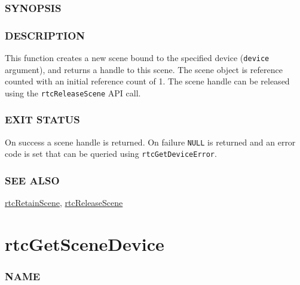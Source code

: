 \subsubsection{SYNOPSIS}\label{synopsis}

\begin{Shaded}
\begin{Highlighting}[]

\OperatorTok{(}\OperatorTok{);}
\end{Highlighting}
\end{Shaded}

\subsubsection{DESCRIPTION}\label{description}

This function creates a new scene bound to the specified device
(\texttt{device} argument), and returns a handle to this scene. The
scene object is reference counted with an initial reference count of 1.
The scene handle can be released using the \texttt{rtcReleaseScene} API
call.

\subsubsection{EXIT STATUS}\label{exit-status}

On success a scene handle is returned. On failure \texttt{NULL} is
returned and an error code is set that can be queried using
\texttt{rtcGetDeviceError}.

\subsubsection{SEE ALSO}\label{see-also}

\hyperref[rtcretainscene]{rtcRetainScene},
\hyperref[rtcreleasescene]{rtcReleaseScene}

\pagebreak

\section{rtcGetSceneDevice}\label{rtcgetscenedevice}

\subsubsection{NAME}\label{name}


